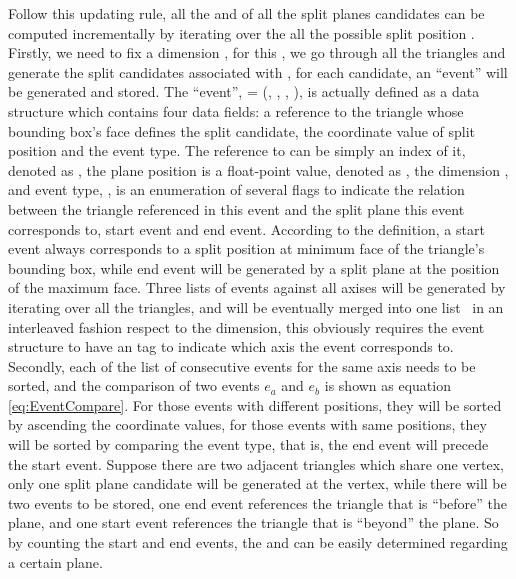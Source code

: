 Follow this updating rule, all the \mynumtrileft and \mynumtriright of all the split planes candidates can be computed incrementally by iterating over the all the possible split position . Firstly, we need to fix a dimension \mydimensiona, for this \mydimension, we go through all the triangles \mytriangle and generate the split candidates associated with \mytriangle, for each candidate, an ``event'' will be generated and stored. The ``event'', \myevent = (\myeventt, \myeventp, \myeventk, \myeventtype), is actually defined as a data structure which contains four data fields: a reference to the triangle whose bounding box's face defines the split candidate, the coordinate value of split position and the event type. The reference to \mytriangle can be simply an index of it, denoted as \myeventt, the plane position is a float-point value, denoted as \myeventp, the dimension \mydimension, and event type, \myeventtype, is an enumeration of several flags to indicate the relation between the triangle referenced in this event and the split plane this event corresponds to, start event and end event. According to the definition, a start event always corresponds to a split position at minimum face of the triangle's bounding box, while end event will be generated by a split plane at the position of the maximum face. Three lists of events against all axises will be generated by iterating over all the triangles, and will be eventually merged into one list \myeventlist\ in an interleaved fashion respect to the dimension, this obviously requires the event structure to have an tag to indicate which axis the event corresponds to. Secondly, each of the list of consecutive events for the same axis needs to be sorted, and the comparison of two events \(e_{a}\) and \(e_{b}\) is shown as equation \ref{eq:EventCompare}. For those events with different positions, they will be sorted by ascending the coordinate values, for those events with same positions, they will be sorted by comparing the event type, that is, the end event will precede the start event. Suppose there are two adjacent triangles which share one vertex, only one split plane candidate will be generated at the vertex, while there will be two events to be stored, one end event references the triangle that is ``before'' the plane, and one start event references the triangle that is ``beyond'' the plane. So by counting the start and end events, the \mynumtrilef and \mynumtriright can be easily determined regarding a certain plane.   


